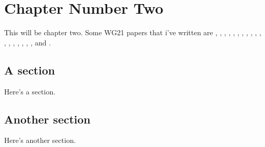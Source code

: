 \chapter{Chapter Number Two}

This will be chapter two.  Some WG21 papers that i've written are
\cite{wg21P1332R0}, \cite{wg21P1333R0}, \cite{wg21P1334R0}, \cite{wg21P1429R0},
\cite{wg21P1429R1}, \cite{wg21P1606R0}, \cite{wg21P1607R0}, \cite{wg21P1429R2},
\cite{wg21P1670R0}, \cite{wg21P1671R0}, \cite{wg21P1672R0}, \cite{wg21P1704R0},
\cite{wg21P1429R3}, \cite{wg21P1607R1}, \cite{wg21P1807R0}, \cite{wg21P1995R0},
\cite{wg21P1995R1}, \cite{wg21P2032R0}, and \cite{wg21P2114R0}.

\section{A section}

Here's a section.

\section{Another section}

Here's another section.


